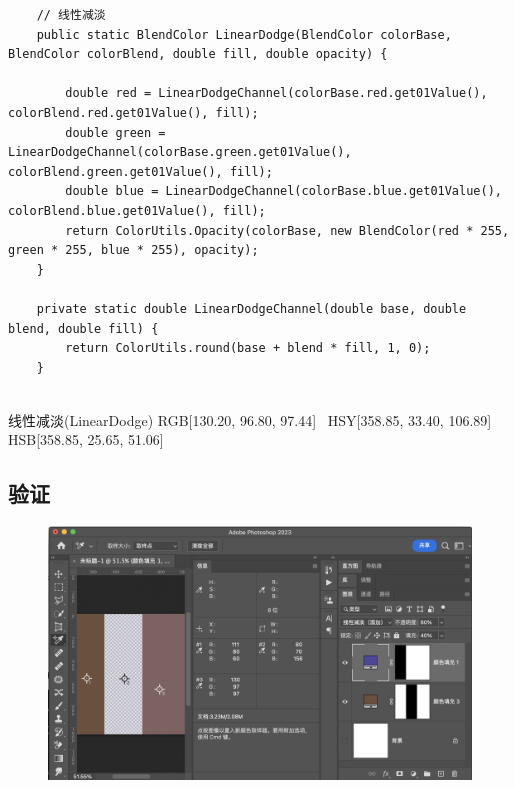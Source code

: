 \begin{lstlisting}
	// 线性减淡
	public static BlendColor LinearDodge(BlendColor colorBase, BlendColor colorBlend, double fill, double opacity) {
		
		double red = LinearDodgeChannel(colorBase.red.get01Value(), colorBlend.red.get01Value(), fill);
		double green = LinearDodgeChannel(colorBase.green.get01Value(), colorBlend.green.get01Value(), fill);
		double blue = LinearDodgeChannel(colorBase.blue.get01Value(), colorBlend.blue.get01Value(), fill);
		return ColorUtils.Opacity(colorBase, new BlendColor(red * 255, green * 255, blue * 255), opacity);
	}
	
	private static double LinearDodgeChannel(double base, double blend, double fill) {
		return ColorUtils.round(base + blend * fill, 1, 0);
	}
	
\end{lstlisting}



\begin{result}
\item 线性减淡(LinearDodge)   RGB[130.20,  96.80,  97.44]~ HSY[358.85,  33.40, 106.89]~ HSB[358.85,  25.65,  51.06]
\end{result}

\subsection{ 验证}
\begin{figure}[h!]
	\centering
	\includegraphics[width=\linewidth]{figure/linearndodge}
	\caption{}
	\label{fig:linearndodge}
\end{figure}

%
%
%

